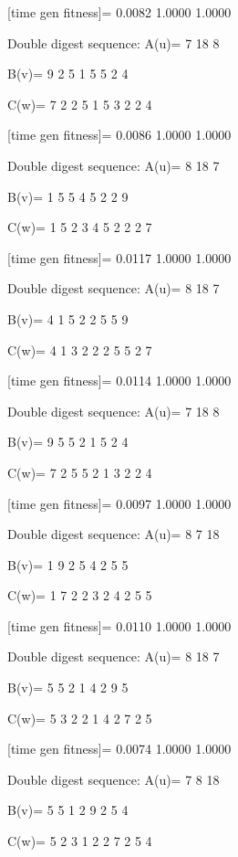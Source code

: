 [time gen fitness]=
    0.0082    1.0000    1.0000

Double digest sequence:
A(u)=
     7    18     8

B(v)=
     9     2     5     1     5     5     2     4

C(w)=
     7     2     2     5     1     5     3     2     2     4

[time gen fitness]=
    0.0086    1.0000    1.0000

Double digest sequence:
A(u)=
     8    18     7

B(v)=
     1     5     5     4     5     2     2     9

C(w)=
     1     5     2     3     4     5     2     2     2     7

[time gen fitness]=
    0.0117    1.0000    1.0000

Double digest sequence:
A(u)=
     8    18     7

B(v)=
     4     1     5     2     2     5     5     9

C(w)=
     4     1     3     2     2     2     5     5     2     7

[time gen fitness]=
    0.0114    1.0000    1.0000

Double digest sequence:
A(u)=
     7    18     8

B(v)=
     9     5     5     2     1     5     2     4

C(w)=
     7     2     5     5     2     1     3     2     2     4

[time gen fitness]=
    0.0097    1.0000    1.0000

Double digest sequence:
A(u)=
     8     7    18

B(v)=
     1     9     2     5     4     2     5     5

C(w)=
     1     7     2     2     3     2     4     2     5     5

[time gen fitness]=
    0.0110    1.0000    1.0000

Double digest sequence:
A(u)=
     8    18     7

B(v)=
     5     5     2     1     4     2     9     5

C(w)=
     5     3     2     2     1     4     2     7     2     5

[time gen fitness]=
    0.0074    1.0000    1.0000

Double digest sequence:
A(u)=
     7     8    18

B(v)=
     5     5     1     2     9     2     5     4

C(w)=
     5     2     3     1     2     2     7     2     5     4

